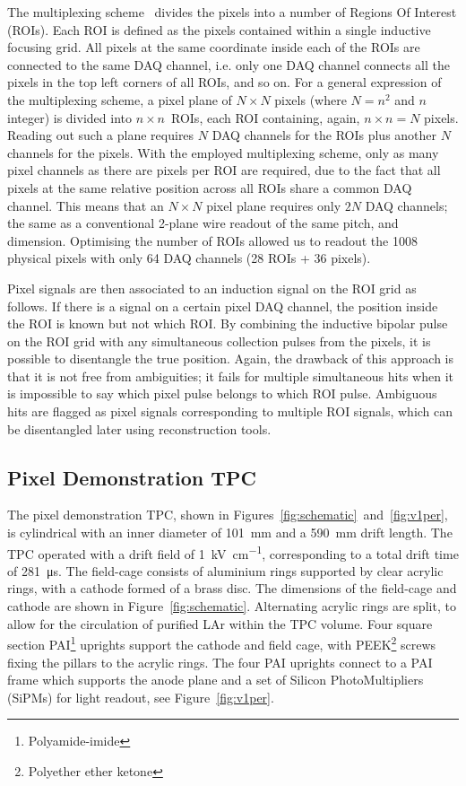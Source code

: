 \documentclass[a4paper]{article}
\begin{document}
The multiplexing scheme~\cite{maplesyrup} divides the pixels into a number of Regions Of Interest (ROIs).
Each ROI is defined as the pixels contained within a single inductive focusing grid.
All pixels at the same coordinate inside each of the ROIs are connected to the same DAQ channel, i.e. only one DAQ channel connects all the pixels in the top left corners of all ROIs, and so on. 
For a general expression of the multiplexing scheme, a pixel plane of $N \times N$ pixels (where $N = n ^ 2$ and $n$ integer) is divided into $n \times n$~ROIs, each ROI containing, again, $n \times n = N$ pixels.
Reading out such a plane requires $N$ DAQ channels for the ROIs plus another $N$ channels for the pixels.
With the employed multiplexing scheme, only as many pixel channels as there are pixels per ROI are required, due to the fact that all pixels at the same relative position across all ROIs share a common DAQ channel.
This means that an $N \times N$ pixel plane requires only $2 N$ DAQ channels; the same as a conventional 2-plane wire readout of the same pitch, and dimension.
Optimising the number of ROIs allowed us to readout the 1008 physical pixels with only 64 DAQ channels (28 ROIs + 36 pixels).

Pixel signals are then associated to an induction signal on the ROI grid as follows. 
If there is a signal on a certain pixel DAQ channel, the position inside the ROI is known but not which ROI.
By combining the inductive bipolar pulse on the ROI grid with any simultaneous collection pulses from the pixels, it is possible to disentangle the true position.
Again, the drawback of this approach is that it is not free from ambiguities; it fails for multiple simultaneous hits when it is impossible to say which pixel pulse belongs to which ROI pulse.
Ambiguous hits are flagged as pixel signals corresponding to multiple ROI signals, which can be disentangled later using reconstruction tools. 

\subsection{Pixel Demonstration TPC} \label{sec:viper}

The pixel demonstration TPC, shown in Figures~\ref{fig:schematic}~and~\ref{fig:v1per}, is cylindrical with an inner diameter of \SI{101}{\milli\metre} and a \SI{590}{\milli\metre} drift length. 
The TPC operated with a drift field of \SI{1}{\kilo\volt\per\centi\metre}, corresponding to a total drift time of \SI{281}{\micro\second}. 
The field-cage consists of aluminium rings supported by clear acrylic rings, with a cathode formed of a brass disc. 
The dimensions of the field-cage and cathode are shown in Figure~\ref{fig:schematic}.
Alternating acrylic rings are split, to allow for the circulation of purified LAr within the TPC volume.
Four square section PAI\footnote{Polyamide-imide} uprights support the cathode and field cage, with PEEK\footnote{Polyether ether ketone} screws fixing the pillars to the acrylic rings.
The four PAI uprights connect to a PAI frame which supports the anode plane and a set of  Silicon PhotoMultipliers (SiPMs) for light readout, see Figure~\ref{fig:v1per}. 
\end{document}
